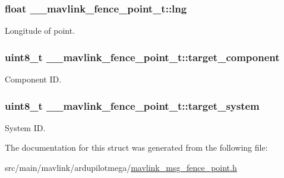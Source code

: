 \hypertarget{struct____mavlink__fence__point__t_aa050c80f5abc951146c1907038053d5c}{
\subsubsection[{lng}]{\setlength{\rightskip}{0pt plus 5cm}float \+\_\+\+\_\+mavlink\+\_\+fence\+\_\+point\+\_\+t\+::lng}}\label{struct____mavlink__fence__point__t_aa050c80f5abc951146c1907038053d5c}


Longitude of point. 

\hypertarget{struct____mavlink__fence__point__t_a3f2fd91d8df704f86007974aa842f9db}{
\subsubsection[{target\+\_\+component}]{\setlength{\rightskip}{0pt plus 5cm}uint8\+\_\+t \+\_\+\+\_\+mavlink\+\_\+fence\+\_\+point\+\_\+t\+::target\+\_\+component}}\label{struct____mavlink__fence__point__t_a3f2fd91d8df704f86007974aa842f9db}


Component I\+D. 

\hypertarget{struct____mavlink__fence__point__t_ad1c253d1f52085a61e2b71dfb9b749b8}{
\subsubsection[{target\+\_\+system}]{\setlength{\rightskip}{0pt plus 5cm}uint8\+\_\+t \+\_\+\+\_\+mavlink\+\_\+fence\+\_\+point\+\_\+t\+::target\+\_\+system}}\label{struct____mavlink__fence__point__t_ad1c253d1f52085a61e2b71dfb9b749b8}


System I\+D. 



The documentation for this struct was generated from the following file\+:\begin{DoxyCompactItemize}
\item 
src/main/mavlink/ardupilotmega/\hyperlink{mavlink__msg__fence__point_8h}{mavlink\+\_\+msg\+\_\+fence\+\_\+point.\+h}\end{DoxyCompactItemize}
